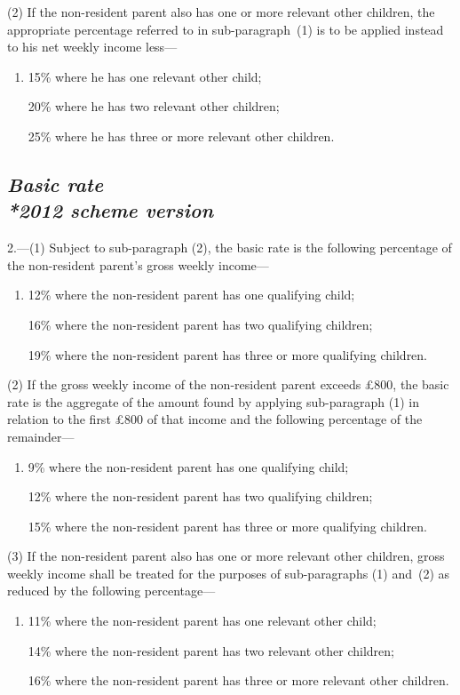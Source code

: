 \documentclass[12pt,a4paper]{article}
\begin{document}
(2) If the non-resident parent also has one or more relevant other children, the appropriate percentage referred to in sub-paragraph~(1)  is to be applied instead to his net weekly income less—
\begin{enumerate}\item[]
    15\% where he has one relevant other child;

    20\% where he has two relevant other children;

    25\% where he has three or more relevant other children. 
\end{enumerate}

\subsection*{\itshape Basic rate\\*\emph{2012 scheme version}}

2.---(1) Subject to sub-paragraph (2), the basic rate is the following percentage of the non-resident parent's gross weekly income—
\begin{enumerate}\item[]
12\% where the non-resident parent has one qualifying child;

16\% where the non-resident parent has two qualifying children;

19\% where the non-resident parent has three or more qualifying children.
\end{enumerate}

(2) If the gross weekly income of the non-resident parent exceeds £800, the basic rate is the aggregate of the amount found by applying sub-paragraph (1) in relation to the first £800 of that income and the following percentage of the remainder—
\begin{enumerate}\item[]
9\% where the non-resident parent has one qualifying child;

12\% where the non-resident parent has two qualifying children;

15\% where the non-resident parent has three or more qualifying children.
\end{enumerate}

(3) If the non-resident parent also has one or more relevant other children, gross weekly income shall be treated for the purposes of sub-paragraphs (1) and~(2) as reduced by the following percentage—
\begin{enumerate}\item[]
11\%  %
where the non-resident parent has one relevant other child;

14\%  %
where the non-resident parent has two relevant other children;

16\%  %
where the non-resident parent has three or more relevant other children.
\end{enumerate}
\end{document}
